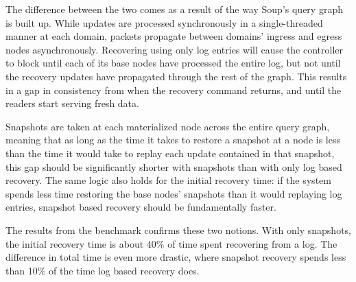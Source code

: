 \documentclass[b5paper]{report}
\begin{document}
The difference between the two comes as a result of the way Soup's query graph
is built up. While updates are processed synchronously in a single-threaded
manner at each domain, packets propagate between domains' ingress and egress
nodes asynchronously. Recovering using only log entries will cause the
controller to block until each of its base nodes have processed the entire log,
but not until the recovery updates have propagated through the rest of the graph.
This results in a gap in consistency from when the recovery command returns, and
until the readers start serving fresh data.

Snapshots are taken at each materialized node across the entire query
graph, meaning that as long as the time it takes to restore a snapshot at a node
is less than the time it would take to replay each update contained in that
snapshot, this gap should be significantly shorter with snapshots than with only
log based recovery. The same logic also holds for the initial recovery time: if
the system spends less time restoring the base nodes' snapshots than it would
replaying log entries, snapshot based recovery should be fundamentally faster.

The results from the benchmark confirms these two notions. With only snapshots,
the initial recovery time is about 40\% of time spent recovering from a log.
The difference in total time is even more drastic, where snapshot recovery
spends less than 10\% of the time log based recovery does.
\end{document}
